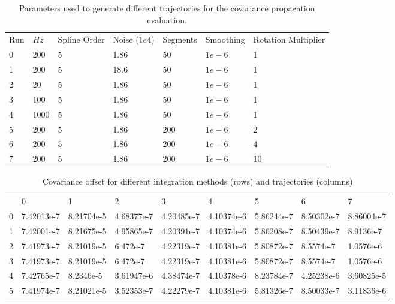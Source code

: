 \documentclass[10pt,a4paper]{article}
\numberwithin{equation}{section}
\begin{document}
\begin{table}
\begin{center}
\begin{tabular}{ l | l | l | l | l | l | l}
Run & $Hz$ & Spline Order & Noise ($1e4$) & Segments & Smoothing & Rotation Multiplier \\
0 & 200 & 5 & 1.86 & 50 & $1e-6$ & 1 \\
1 & 200 & 5 & 18.6 & 50 &  $1e-6$ & 1 \\
2 & 20 & 5 & 1.86 & 50 &  $1e-6$ & 1 \\
3 & 100 & 5 & 1.86 & 50 &  $1e-6$ & 1 \\
4 & 1000 & 5 & 1.86 & 50 &  $1e-6$ & 1 \\
5 & 200 & 5 & 1.86 & 200 &  $1e-6$ & 2 \\
6 & 200 & 5 & 1.86 & 200 & $1e-6$ & 4 \\
7 & 200 & 5 & 1.86 & 200 & $1e-6$ & 10 \\
\end{tabular}
\end{center}
\caption{Parameters used to generate different trajectories for the covariance propagation evaluation.}
\label{tbl:rotation_integration_covariance_run_parameters}
\end{table}


\begin{table}
\begin{center}
\begin{tabular}{ l | l | l | l | l | l | l | l | l }
 & 0 & 1& 2 & 3 & 4 & 5 & 6 & 7 \\
0 & 7.42013e-7 & 8.21704e-5 & 4.68377e-7 & 4.20485e-7 & 4.10374e-6 & 5.86244e-7 & 8.50302e-7 & 8.86004e-7 \\
1 & 7.42001e-7 & 8.21675e-5 & 4.95865e-7 & 4.20391e-7 & 4.10374e-6 & 5.86208e-7 & 8.50439e-7 & 8.9136e-7 \\
2 & 7.41973e-7 & 8.21019e-5 & 6.472e-7 & 4.22319e-7 & 4.10381e-6 & 5.80872e-7 & 8.5574e-7 & 1.0576e-6 \\
3 & 7.41973e-7 & 8.21019e-5 & 6.472e-7 & 4.22319e-7 & 4.10381e-6 & 5.80872e-7 & 8.5574e-7 & 1.0576e-6 \\
4 & 7.42765e-7 & 8.2346e-5 & 3.61947e-6 & 4.38474e-7 & 4.10378e-6 & 8.23784e-7 & 4.25238e-6 & 3.60825e-5 \\
5 & 7.41974e-7 & 8.21021e-5 & 3.52353e-7 & 4.22279e-7 & 4.10381e-6 & 5.81326e-7 & 8.50033e-7 & 3.11836e-6
\end{tabular}
\end{center}
\caption{Covariance offset for different integration methods (rows) and trajectories (columns)}
\label{tbl:rotation_integration_covariance_values}
\end{table}
\end{document}
